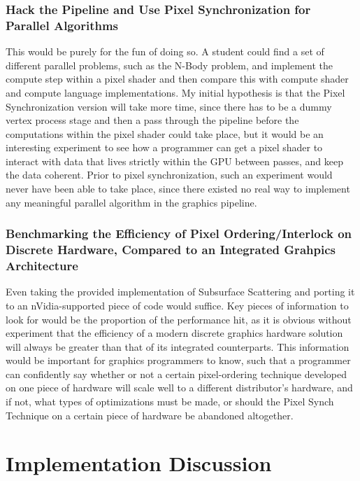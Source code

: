 \documentclass[a4paper, 12pt]{article}
\begin{document}
\subsubsection{Hack the Pipeline and Use Pixel Synchronization for Parallel
Algorithms}

This would be purely for the fun of doing so. A student could find a set of
different parallel problems, such as the N-Body problem, and implement the
compute step within a pixel shader and then compare this with compute shader
and compute language implementations. My initial hypothesis is that the Pixel
Synchronization version will take more time, since there has to be a dummy
vertex process stage and then a pass through the pipeline before the
computations within the pixel shader could take place, but it would be an
interesting experiment to see how a programmer can get a pixel shader to
interact with data that lives strictly within the GPU between passes, and keep
the data coherent. Prior to pixel synchronization, such an experiment would
never have been able to take place, since there existed no real way to
implement any meaningful parallel algorithm in the graphics pipeline.

\subsubsection{Benchmarking the Efficiency of Pixel Ordering/Interlock on Discrete Hardware, Compared to an Integrated Grahpics Architecture}

Even taking the provided implementation of Subsurface Scattering and porting
it to an nVidia-supported piece of code would suffice. Key pieces of
information to look for would be the proportion of the performance hit, as it
is obvious without experiment that the efficiency of a modern discrete
graphics hardware solution will always be greater than that of its integrated
counterparts. This information would be important for graphics programmers to
know, such that a programmer can confidently say whether or not a certain
pixel-ordering technique developed on one piece of hardware will scale well to
a different distributor's hardware, and if not, what types of optimizations
must be made, or should the Pixel Synch Technique on a certain piece of
hardware be abandoned altogether.

\pagebreak

\section{Implementation Discussion}
\label{section:ImplementationDiscussion}
\end{document}
